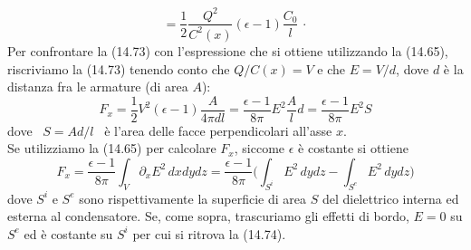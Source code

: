 \begin{enumerate}
\begin{equation}
      =\frac{1}{2}\frac{Q^2}{C^2(x)}(\epsilon-1)\frac{C_0}{l}\,\cdot
      \tag{14.73}
    \end{equation}
    Per confrontare la (14.73) con l'espressione che si ottiene utilizzando la
    (14.65), riscriviamo la (14.73) tenendo conto che $Q/C(x)=V$ e che $E=V/d$,
    dove $d$ \`e la distanza fra le armature (di area $A$):
    \begin{equation}
      F_x=\frac{1}{2}V^2(\epsilon-1)\frac{A}{4\pi dl}
      =\frac{\epsilon-1}{8\pi}E^2\frac{A}{l}d=\frac{\epsilon-1}{8\pi}E^2S
      \tag{14.74}
    \end{equation}
    dove \ $S=Ad/l$ \ \`e l'area delle facce perpendicolari all'asse $x$.\\
    Se utilizziamo la (14.65) per calcolare $F_x$, siccome $\epsilon$ \`e
    costante si ottiene
    \begin{equation}
      F_x=\frac{\epsilon-1}{8\pi}\int_V\partial_xE^2\,dxdydz
      =\frac{\epsilon-1}{8\pi}\Big(\int_{S^i}E^2\,dydz-\int_{S^e}E^2\,dydz\Big)
      \tag{14.75}
    \end{equation}
    dove $S^i$ e $S^e$ sono rispettivamente la superficie di area $S$ del
    dielettrico interna ed esterna al condensatore. Se, come sopra, trascuriamo
    gli effetti di bordo, $E=0$ su $S^e$ ed \`e costante su $S^i$ per cui si
    ritrova la (14.74).


\end{enumerate}
